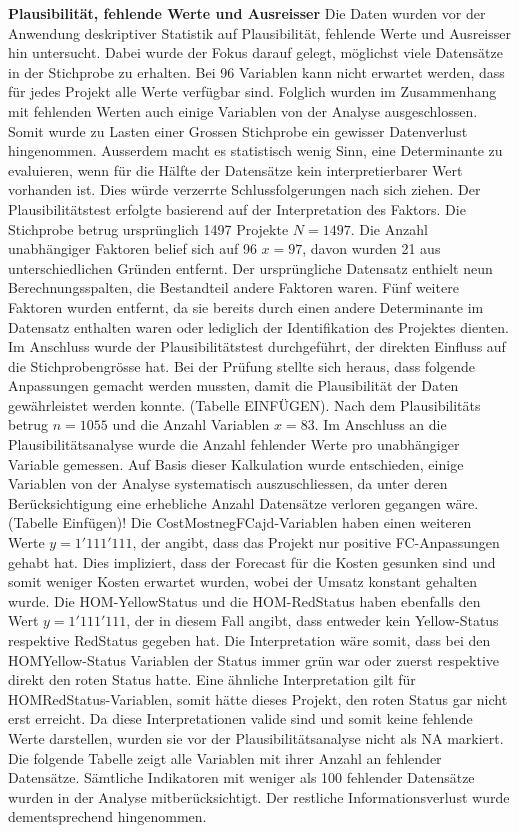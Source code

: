 \documentclass[11pt]{article}
\begin{document}
\newline
\newline\textbf{Plausibilität, fehlende Werte und Ausreisser}
\newline
Die Daten wurden vor der Anwendung deskriptiver Statistik auf Plausibilität, fehlende Werte und Ausreisser hin untersucht. Dabei wurde der Fokus darauf gelegt, möglichst viele Datensätze in der Stichprobe zu erhalten. Bei 96 Variablen kann nicht erwartet werden, dass für jedes Projekt alle Werte verfügbar sind. Folglich wurden im Zusammenhang mit fehlenden Werten auch einige Variablen von der Analyse ausgeschlossen. Somit wurde zu Lasten einer Grossen Stichprobe ein gewisser Datenverlust hingenommen. Ausserdem macht es statistisch wenig Sinn, eine Determinante zu evaluieren, wenn für die Hälfte der Datensätze kein interpretierbarer Wert vorhanden ist. Dies würde verzerrte Schlussfolgerungen nach sich ziehen.
\newline Der Plausibilitätstest erfolgte basierend auf der Interpretation des Faktors. Die Stichprobe betrug ursprünglich 1497 Projekte $N = 1497$. Die Anzahl unabhängiger Faktoren belief sich auf 96 $x = 97$, davon wurden 21 aus unterschiedlichen Gründen entfernt. Der ursprüngliche Datensatz enthielt neun Berechnungsspalten, die Bestandteil andere Faktoren waren. Fünf weitere Faktoren wurden entfernt, da sie bereits durch einen andere Determinante im Datensatz enthalten waren oder lediglich der Identifikation des Projektes dienten. Im Anschluss wurde der Plausibilitätstest durchgeführt, der direkten Einfluss auf die Stichprobengrösse hat. Bei der Prüfung stellte sich heraus, dass folgende Anpassungen gemacht werden mussten, damit die Plausibilität der Daten gewährleistet werden konnte. (Tabelle EINFÜGEN).
\newline Nach dem Plausibilitäts betrug $n = 1055$ und die Anzahl Variablen $x = 83$. Im Anschluss an die Plausibilitätsanalyse wurde die Anzahl fehlender Werte pro unabhängiger Variable gemessen. Auf Basis dieser Kalkulation wurde entschieden, einige Variablen von der Analyse systematisch auszuschliessen, da unter deren Berücksichtigung eine erhebliche Anzahl Datensätze verloren gegangen wäre. (Tabelle Einfügen)! Die CostMostnegFCajd-Variablen haben einen weiteren Werte $y = 1'111'111$, der angibt, dass das Projekt nur positive FC-Anpassungen gehabt hat. Dies impliziert, dass der Forecast für die Kosten gesunken sind und somit weniger Kosten erwartet wurden, wobei der Umsatz konstant gehalten wurde. Die HOM-YellowStatus und die HOM-RedStatus haben ebenfalls den Wert $y = 1'111'111$, der in diesem Fall angibt, dass entweder kein Yellow-Status respektive RedStatus gegeben hat. Die Interpretation wäre somit, dass bei den HOMYellow-Status Variablen der Status immer grün war oder zuerst respektive direkt den roten Status hatte. Eine ähnliche Interpretation gilt für HOMRedStatus-Variablen, somit hätte dieses Projekt, den roten Status gar nicht erst erreicht. Da diese Interpretationen valide sind und somit keine fehlende Werte darstellen, wurden sie vor der Plausibilitätsanalyse nicht als NA markiert. Die folgende Tabelle zeigt alle Variablen mit ihrer Anzahl an fehlender Datensätze. Sämtliche Indikatoren mit weniger als 100 fehlender Datensätze wurden in der Analyse mitberücksichtigt. Der restliche Informationsverlust wurde dementsprechend hingenommen. 
\end{document}

